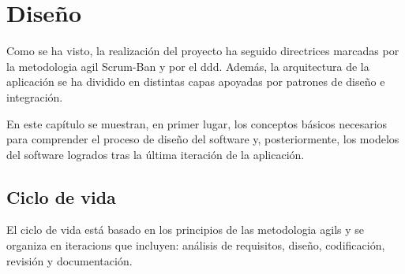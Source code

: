 \chapter[Diseño]{
  \label{chp:disenho}
  Diseño
}
\minitoc
\newpage

Como se ha visto, la realización del proyecto ha seguido directrices marcadas
por la \gls{metodologia agil} \gls{Scrum-Ban} y por el \gls{ddd}. Además,
la arquitectura de la aplicación se ha dividido en distintas capas apoyadas por
patrones de diseño e integración.

En este capítulo se muestran, en primer lugar, los conceptos básicos necesarios
para comprender el proceso de diseño del software y, posteriormente, los modelos
del software logrados tras la última iteración de la aplicación.


\section{Ciclo de vida}

El ciclo de vida está basado en los principios de las \glspl{metodologia agil} y
se organiza en \glspl{iteracion} que incluyen: análisis de requisitos,
diseño, codificación, revisión y documentación.
